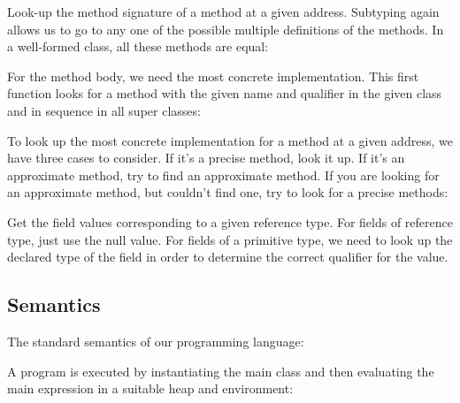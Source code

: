 \vspace{0.5ex}
\ottdefnrftype{}
\vspace{2.0ex}


Look-up the method signature of a method at a given address.
Subtyping again allows us to go to any one of the possible multiple
definitions of the methods. In a well-formed class, all these methods
are equal:

\vspace{0.5ex}
\ottdefnrmsign{}
\vspace{2.0ex}


For the method body, we need the most concrete implementation.
This first function looks for a method with the given name and
qualifier in the given class and in sequence in all super classes:

\vspace{0.5ex}
\ottdefnsmbodyc{}
\vspace{2.0ex}


To look up the most concrete implementation for a method at a given
address, we have three cases to consider.
If it's a precise method, look it up.
If it's an approximate method, try to find an approximate method.
If you are looking for an approximate method, but couldn't find one,
try to look for a precise methods:

\vspace{0.5ex}
\ottdefnrmbody{}
\vspace{2.0ex}


Get the field values corresponding to a given reference type.
For fields of reference type, just use the null value.
For fields of a primitive type, we need to look up the declared type
of the field in order to determine the correct qualifier for the
value.

\vspace{0.5ex}
\ottdefnfvsinit{}
\vspace{2.0ex}


\subsection{Semantics}

The standard semantics of our programming language:

\vspace{0.5ex}
\ottdefnsemantics{}
\vspace{2.0ex}


A program is executed by instantiating the main class and then
evaluating the main expression in a suitable heap and environment:

